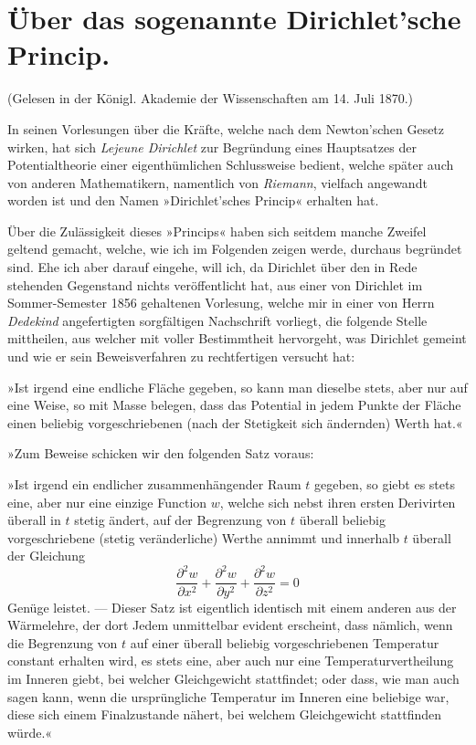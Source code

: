 \documentclass{article}
\begin{document}

\section*{Über das sogenannte Dirichlet’sche Princip.}

(Gelesen in der Königl. Akademie der Wissenschaften am 14. Juli 1870.)

In seinen Vorlesungen über die Kräfte, welche nach dem Newton’schen Gesetz wirken, hat sich \emph{Lejeune Dirichlet} zur Begründung eines Hauptsatzes der Potentialtheorie einer eigenthümlichen Schlussweise bedient, welche später auch von anderen Mathematikern, namentlich von \emph{Riemann}, vielfach angewandt worden ist und den Namen »Dirichlet’sches Princip« erhalten hat.

Über die Zulässigkeit dieses »Princips« haben sich seitdem manche Zweifel geltend gemacht, welche, wie ich im Folgenden zeigen werde, durchaus begründet sind. Ehe ich aber darauf eingehe, will ich, da Dirichlet über den in Rede stehenden Gegenstand nichts veröffentlicht hat, aus einer von Dirichlet im Sommer-Semester 1856 gehaltenen Vorlesung, welche mir in einer von Herrn \emph{Dedekind} angefertigten sorgfältigen Nachschrift vorliegt, die folgende Stelle mittheilen, aus welcher mit voller Bestimmtheit hervorgeht, was Dirichlet gemeint und wie er sein Beweisverfahren zu rechtfertigen versucht hat:

»Ist irgend eine endliche Fläche gegeben, so kann man dieselbe stets, aber nur auf eine Weise, so mit Masse belegen, dass das Potential in jedem Punkte der Fläche einen beliebig vorgeschriebenen (nach der Stetigkeit sich ändernden) Werth hat.«

»Zum Beweise schicken wir den folgenden Satz voraus:

»Ist irgend ein endlicher zusammenhängender Raum $t$ gegeben, so giebt es stets eine, aber nur eine einzige Function $w$, welche sich nebst ihren ersten Derivirten überall in $t$ stetig ändert, auf der Begrenzung von $t$ überall
beliebig vorgeschriebene (stetig veränderliche) Werthe annimmt und innerhalb $t$ überall der Gleichung
\[
\frac{\partial^{2}w}{\partial x^{2}} + \frac{\partial^{2}w}{\partial y^{2}} + \frac{\partial^{2}w}{\partial z^{2}} = 0
\]
Genüge leistet. --- Dieser Satz ist eigentlich identisch mit einem anderen aus der Wärmelehre, der dort Jedem unmittelbar evident erscheint, dass nämlich, wenn die Begrenzung von $t$ auf einer überall beliebig vorgeschriebenen Temperatur constant erhalten wird, es stets eine, aber auch nur eine Temperaturvertheilung im Inneren giebt, bei welcher Gleichgewicht stattfindet; oder dass, wie man auch sagen kann, wenn die ursprüngliche Temperatur im Inneren eine beliebige war, diese sich einem Finalzustande nähert, bei welchem Gleichgewicht stattfinden würde.«
\end{document}
